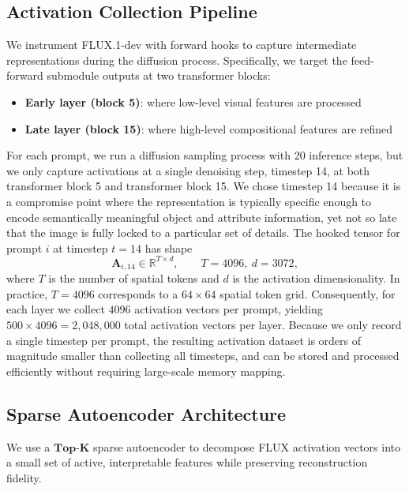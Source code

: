 \documentclass{article}
\begin{document}
\subsection{Activation Collection Pipeline}

We instrument FLUX.1-dev with forward hooks to capture intermediate representations during the diffusion process. Specifically, we target the feed-forward submodule outputs at two transformer blocks:
\begin{itemize}
    \item \textbf{Early layer (block 5)}: where low-level visual features are processed
    \item \textbf{Late layer (block 15)}: where high-level compositional features are refined
\end{itemize}

For each prompt, we run a diffusion sampling process with 20 inference steps, but we only capture activations at a single denoising step, timestep 14, at both transformer block 5 and transformer block 15. We chose timestep 14 because it is a compromise point where the representation is typically specific enough to encode semantically meaningful object and attribute information, yet not so late that the image is fully locked to a particular set of details. The hooked tensor for prompt $i$ at timestep $t=14$ has shape
\begin{equation}
\mathbf{A}_{i,14} \in \mathbb{R}^{T \times d}, \qquad T = 4096,\ d = 3072,
\end{equation}
where $T$ is the number of spatial tokens and $d$ is the activation dimensionality. In practice, $T=4096$ corresponds to a $64 \times 64$ spatial token grid. Consequently, for each layer we collect $4096$ activation vectors per prompt, yielding $500 \times 4096 = 2{,}048{,}000$ total activation vectors per layer. Because we only record a single timestep per prompt, the resulting activation dataset is orders of magnitude smaller than collecting all timesteps, and can be stored and processed efficiently without requiring large-scale memory mapping.

\subsection{Sparse Autoencoder Architecture}

We use a $\textbf{Top-K}$ sparse autoencoder to decompose FLUX activation vectors into a small set of active, interpretable features while preserving reconstruction fidelity.
\end{document}
